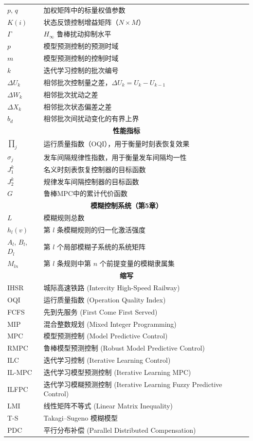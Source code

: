 \begin{table}[htpb]
\begin{center}
\begin{tabular}{l@{\hspace{30pt}}l}
$p$, $q$ & 加权矩阵中的标量权值参数 \\
$K(i)$ & 状态反馈控制增益矩阵（$N\times M$）\\
$\Gamma$ & $H_{\infty}$ 鲁棒扰动抑制水平 \\
$p$ & 模型预测控制的预测时域 \\
$m$ & 模型预测控制的控制时域 \\
$k$ & 迭代学习控制的批次编号 \\
$\Delta U_{k}$ & 相邻批次控制量之差，$\Delta U_k = U_k - U_{k-1}$ \\
$\Delta W_{k}$ & 相邻批次扰动之差 \\
$\Delta X_{k}$ & 相邻批次状态偏差之差 \\
$b_d$ & 相邻批次间扰动变化的有界上界 \\
\hline
\multicolumn{2}{c}{\textbf{性能指标}} \\
\hline
$\prod_{j}$ & 运行质量指数（OQI），用于衡量时刻表恢复效果 \\
$\sigma_{j}$ & 发车间隔规律性指数，用于衡量发车间隔均一性 \\
$J_1^{k}$ & 名义时刻表恢复控制器的目标函数 \\
$J_2^{k}$ & 规律发车间隔控制器的目标函数 \\
$G$ & 鲁棒MPC中的累计代价函数 \\
\hline
\multicolumn{2}{c}{\textbf{模糊控制系统（第5章）}} \\
\hline
$L$ & 模糊规则总数 \\
$h_l(v)$ & 第 $l$ 条模糊规则的归一化激活强度 \\
$A_l$, $B_l$, $D_l$ & 第 $l$ 个局部模糊子系统的系统矩阵 \\
$M_{ln}$ & 第 $l$ 条规则中第 $n$ 个前提变量的模糊隶属集 \\
\hline
\multicolumn{2}{c}{\textbf{缩写}} \\
\hline
IHSR & 城际高速铁路 (Intercity High-Speed Railway)\\
OQI & 运行质量指数 (Operation Quality Index)\\
FCFS & 先到先服务 (First Come First Served)\\
MIP & 混合整数规划 (Mixed Integer Programming)\\
MPC & 模型预测控制 (Model Predictive Control)\\
RMPC & 鲁棒模型预测控制 (Robust Model Predictive Control)\\
ILC & 迭代学习控制 (Iterative Learning Control)\\
IL-MPC & 迭代学习模型预测控制 (Iterative Learning MPC)\\
ILFPC & 迭代学习模糊预测控制 (Iterative Learning Fuzzy Predictive Control)\\
LMI & 线性矩阵不等式 (Linear Matrix Inequality)\\
T-S & Takagi–Sugeno 模糊模型 \\
PDC & 平行分布补偿 (Parallel Distributed Compensation)\\
\hline
\end{tabular}\label{symbol}
\end{center}
\end{table}

